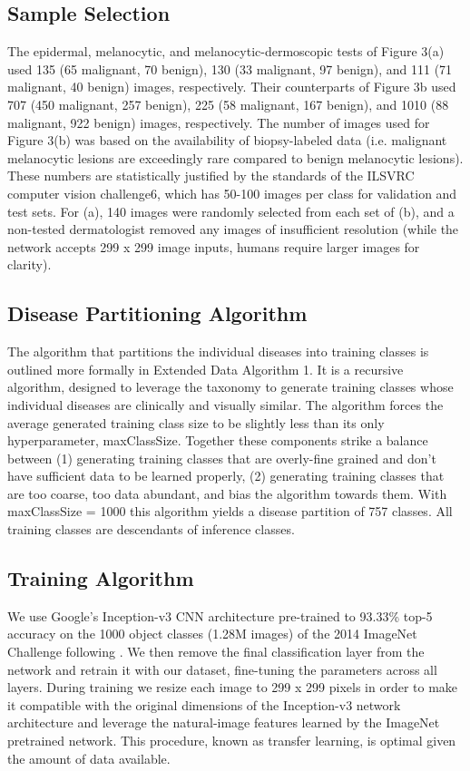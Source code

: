 \subsection{Sample Selection}
The epidermal, melanocytic, and melanocytic-dermoscopic tests of Figure 3(a) used 135 (65 malignant, 70 benign), 130 (33 malignant, 97 benign), and 111 (71 malignant, 40 benign) images, respectively. Their counterparts of Figure 3b used 707 (450 malignant, 257 benign), 225 (58 malignant, 167 benign), and 1010 (88 malignant, 922 benign) images, respectively. The number of images used for Figure 3(b) was based on the availability of biopsy-labeled data (i.e. malignant melanocytic lesions are exceedingly rare compared to benign melanocytic lesions). These numbers are statistically justified by the standards of the ILSVRC computer vision challenge6, which has 50-100 images per class for validation and test sets. For (a), 140 images were randomly selected from each set of (b), and a non-tested dermatologist removed any images of insufficient resolution (while the network accepts 299 x 299 image inputs, humans require larger images for clarity). 

\subsection{Disease Partitioning Algorithm}
The algorithm that partitions the individual diseases into training classes is outlined more formally in Extended Data Algorithm 1. It is a recursive algorithm, designed to leverage the taxonomy to generate training classes whose individual diseases are clinically and visually similar. The algorithm forces the average generated training class size to be slightly less than its only hyperparameter, maxClassSize. Together these components strike a balance between (1) generating training classes that are overly-fine grained and don’t have sufficient data to be learned properly, (2) generating training classes that are too coarse, too data abundant, and bias the algorithm towards them. With maxClassSize = 1000 this algorithm yields a disease partition of 757 classes. All training classes are descendants of inference classes.

\subsection{Training Algorithm}
We use Google’s Inception-v3 CNN architecture pre-trained to 93.33\% top-5 accuracy on the 1000 object classes (1.28M images) of the 2014 ImageNet Challenge following \cite{szegedy2016rethinking}. We then remove the final classification layer from the network and retrain it with our dataset, fine-tuning the parameters across all layers. During training we resize each image to 299 x 299 pixels in order to make it compatible with the original dimensions of the Inception-v3 network architecture and leverage the natural-image features learned by the ImageNet pretrained network. This procedure, known as transfer learning, is optimal given the amount of data available.

